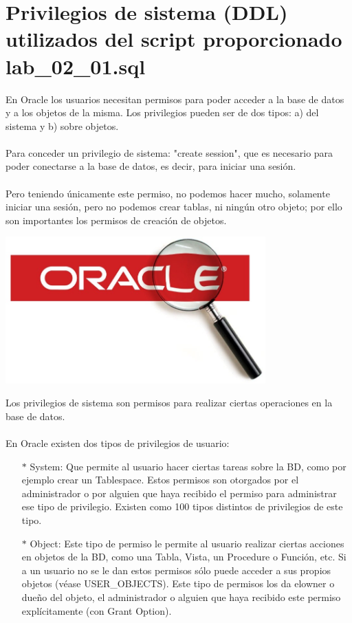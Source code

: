 \section{Privilegios de sistema (DDL) utilizados del script proporcionado lab\_02\_01.sql}
\vspace{\baselineskip}
En Oracle los usuarios necesitan permisos para poder acceder a la base de datos y a los objetos de la misma. Los privilegios pueden ser de dos tipos: a) del sistema y b) sobre objetos.\\ \\
Para conceder un privilegio de sistema: "create session", que es necesario para poder conectarse a la base de datos, es decir, para iniciar una sesión.\\ \\
Pero teniendo únicamente este permiso, no podemos hacer mucho, solamente iniciar una sesión, pero no podemos crear tablas, ni ningún otro objeto; por ello son importantes los permisos de creación de objetos.
	\begin{center}
		\includegraphics[width=10cm]{./Imagenes/2} 
	\end{center}
	Los privilegios de sistema son permisos para realizar ciertas operaciones en la base de datos.\\ \\
	En Oracle existen dos tipos de privilegios de usuario:
	\begin{itemize}
		\item[$*$] System: Que permite al usuario hacer ciertas tareas sobre la BD, como por ejemplo crear un Tablespace. Estos permisos son otorgados por el administrador o por alguien que haya recibido el permiso para administrar ese tipo de privilegio. Existen como 100 tipos distintos de privilegios de este tipo.
		\item[$*$] Object: Este tipo de permiso le permite al usuario realizar ciertas acciones en objetos de la BD, como una Tabla, Vista, un Procedure o Función, etc. Si a un usuario no se le dan estos permisos sólo puede acceder a sus propios objetos (véase USER\_OBJECTS). Este tipo de permisos los da elowner o dueño del objeto, el administrador o alguien que haya recibido este permiso explícitamente (con Grant Option).\\
\\
	\end{itemize}	
